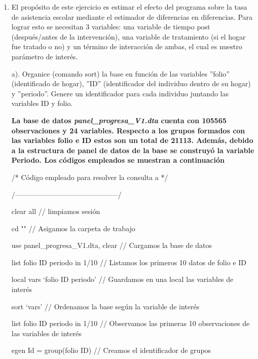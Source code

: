 \documentclass[12pt]{article}
\begin{document}
\begin{enumerate}
\item  El propósito de este ejercicio es estimar el efecto del programa sobre la tasa de asistencia escolar mediante el estimador de diferencias en diferencias. Para lograr esto se necesitan 3 variables: una variable de tiempo post (después/antes de la intervención), una variable de tratamiento (si el hogar fue tratado o no) y un término de interacción de ambas, el cual es nuestro parámetro de interés. 

\end{enumerate}

\vspace{0.5cm}

\begin{enumerate}
\item [a).] Organice (comando sort) la base en función de las variables ''folio'' (identificado de hogar), ''ID'' (identificador del individuo dentro de su hogar) y ''periodo''. Genere un identificador para cada individuo juntando las variables ID y folio. 

\vspace{0.5cm}

\textbf{La base de datos \textit{panel\_progresa\_V1.dta} cuenta con 105565 observaciones y 24 variables. Respecto a los grupos formados con las variables folio e ID estos son un total de 21113. Además, debido a la estructura de panel de datos de la base se construyó la variable Periodo. Los códigos empleados se muestran a continuación}

\begin{statacode}
/* Código empleado para resolver la consulta a */ 

/--------------------------------------------/ 

clear all  // limpiamos sesión 

cd ""  // Asigamos la carpeta de trabajo

use panel\_progresa\_V1.dta, clear  // Cargamos la base de datos

list  folio ID periodo in 1/10 // Listamos los primeros 10 datos de folio e ID 


local vars `folio ID periodo' // Guardamos en una local las variables de interés

sort `vars' // Ordenamos la base según la variable de interés 


list  folio ID periodo in 1/10 // Observamos las primeras 10 observaciones de las variables de interés

egen Id = group(folio ID) // Creamos el identificador de grupos



\end{statacode}
\end{enumerate}
\end{document}
